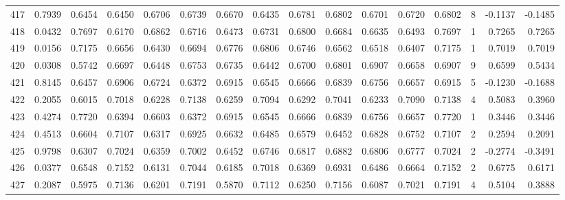 \begin{tabular}{lrrrrrrrrrrrrrrr}
417 &      0.7939 &  0.6454 &  0.6450 &  0.6706 &  0.6739 &  0.6670 &  0.6435 &  0.6781 &  0.6802 &  0.6701 &   0.6720 &     0.6802 &      8 &                   -0.1137 &                    -0.1485 \\
418 &      0.0432 &  0.7697 &  0.6170 &  0.6862 &  0.6716 &  0.6473 &  0.6731 &  0.6800 &  0.6684 &  0.6635 &   0.6493 &     0.7697 &      1 &                    0.7265 &                     0.7265 \\
419 &      0.0156 &  0.7175 &  0.6656 &  0.6430 &  0.6694 &  0.6776 &  0.6806 &  0.6746 &  0.6562 &  0.6518 &   0.6407 &     0.7175 &      1 &                    0.7019 &                     0.7019 \\
420 &      0.0308 &  0.5742 &  0.6697 &  0.6448 &  0.6753 &  0.6735 &  0.6442 &  0.6700 &  0.6801 &  0.6907 &   0.6658 &     0.6907 &      9 &                    0.6599 &                     0.5434 \\
421 &      0.8145 &  0.6457 &  0.6906 &  0.6724 &  0.6372 &  0.6915 &  0.6545 &  0.6666 &  0.6839 &  0.6756 &   0.6657 &     0.6915 &      5 &                   -0.1230 &                    -0.1688 \\
422 &      0.2055 &  0.6015 &  0.7018 &  0.6228 &  0.7138 &  0.6259 &  0.7094 &  0.6292 &  0.7041 &  0.6233 &   0.7090 &     0.7138 &      4 &                    0.5083 &                     0.3960 \\
423 &      0.4274 &  0.7720 &  0.6394 &  0.6603 &  0.6372 &  0.6915 &  0.6545 &  0.6666 &  0.6839 &  0.6756 &   0.6657 &     0.7720 &      1 &                    0.3446 &                     0.3446 \\
424 &      0.4513 &  0.6604 &  0.7107 &  0.6317 &  0.6925 &  0.6632 &  0.6485 &  0.6579 &  0.6452 &  0.6828 &   0.6752 &     0.7107 &      2 &                    0.2594 &                     0.2091 \\
425 &      0.9798 &  0.6307 &  0.7024 &  0.6359 &  0.7002 &  0.6452 &  0.6746 &  0.6817 &  0.6882 &  0.6806 &   0.6777 &     0.7024 &      2 &                   -0.2774 &                    -0.3491 \\
426 &      0.0377 &  0.6548 &  0.7152 &  0.6131 &  0.7044 &  0.6185 &  0.7018 &  0.6369 &  0.6931 &  0.6486 &   0.6664 &     0.7152 &      2 &                    0.6775 &                     0.6171 \\
427 &      0.2087 &  0.5975 &  0.7136 &  0.6201 &  0.7191 &  0.5870 &  0.7112 &  0.6250 &  0.7156 &  0.6087 &   0.7021 &     0.7191 &      4 &                    0.5104 &                     0.3888 \\

\end{tabular}
